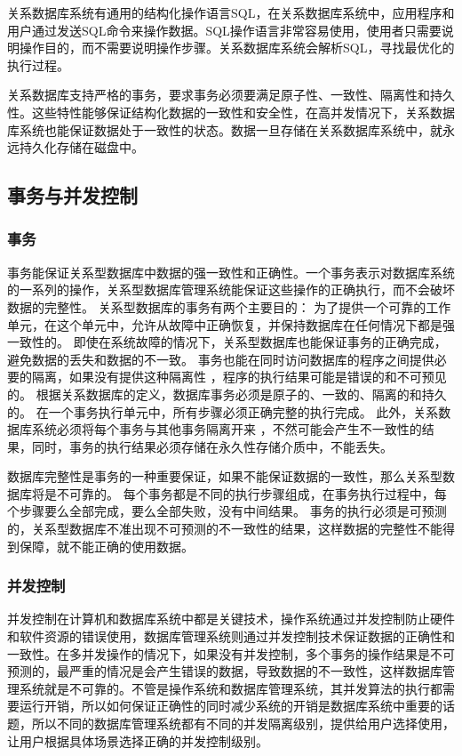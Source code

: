 关系数据库系统有通用的结构化操作语言SQL，在关系数据库系统中，应用程序和用户通过发送SQL命令来操作数据。SQL操作语言非常容易使用，使用者只需要说明操作目的，而不需要说明操作步骤。关系数据库系统会解析SQL，寻找最优化的执行过程。

关系数据库支持严格的事务，要求事务必须要满足原子性、一致性、隔离性和持久性。这些特性能够保证结构化数据的一致性和安全性，在高并发情况下，关系数据库系统也能保证数据处于一致性的状态。数据一旦存储在关系数据库系统中，就永远持久化存储在磁盘中。
\subsection{事务与并发控制}
\subsubsection{事务}
事务能保证关系型数据库中数据的强一致性和正确性。一个事务表示对数据库系统的一系列的操作，关系型数据库管理系统能保证这些操作的正确执行，而不会破坏数据的完整性。
关系型数据库的事务有两个主要目的：
为了提供一个可靠的工作单元，在这个单元中，允许从故障中正确恢复，并保持数据库在任何情况下都是强一致性的。
即使在系统故障的情况下，关系型数据库也能保证事务的正确完成，避免数据的丢失和数据的不一致。
事务也能在同时访问数据库的程序之间提供必要的隔离，如果没有提供这种隔离性
，程序的执行结果可能是错误的和不可预见的。
根据关系数据库的定义，数据库事务必须是原子的、一致的、隔离的和持久的。
在一个事务执行单元中，所有步骤必须正确完整的执行完成。
此外，关系数据库系统必须将每个事务与其他事务隔离开来
，不然可能会产生不一致性的结果，同时，事务的执行结果必须存储在永久性存储介质中，不能丢失。

数据库完整性是事务的一种重要保证，如果不能保证数据的一致性，那么关系型数据库将是不可靠的。
每个事务都是不同的执行步骤组成，在事务执行过程中，每个步骤要么全部完成，要么全部失败，没有中间结果。
事务的执行必须是可预测的，关系型数据库不准出现不可预测的不一致性的结果，这样数据的完整性不能得到保障，就不能正确的使用数据。
\subsubsection{并发控制}
并发控制在计算机和数据库系统中都是关键技术，操作系统通过并发控制防止硬件和软件资源的错误使用，数据库管理系统则通过并发控制技术保证数据的正确性和一致性。在多并发操作的情况下，如果没有并发控制，多个事务的操作结果是不可预测的，最严重的情况是会产生错误的数据，导致数据的不一致性，这样数据库管理系统就是不可靠的。不管是操作系统和数据库管理系统，其并发算法的执行都需要运行开销，所以如何保证正确性的同时减少系统的开销是数据库系统中重要的话题，所以不同的数据库管理系统都有不同的并发隔离级别，提供给用户选择使用，让用户根据具体场景选择正确的并发控制级别。

